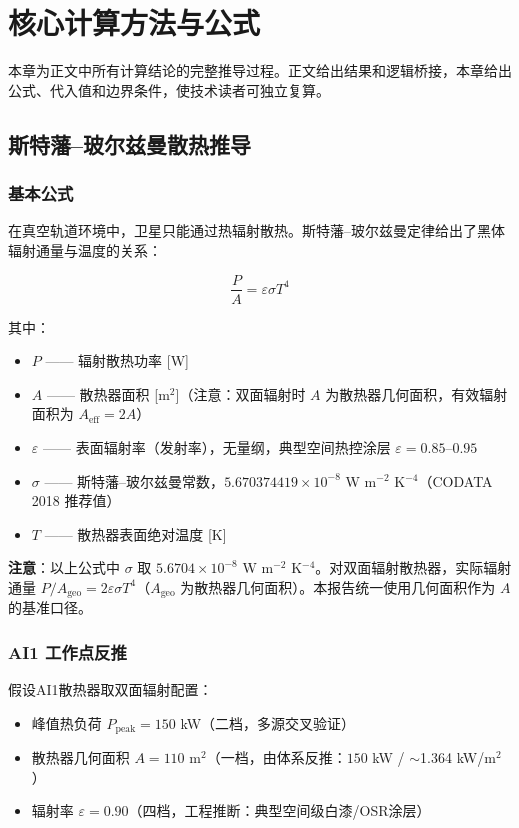 
\section{核心计算方法与公式}

本章为正文中所有计算结论的完整推导过程。正文给出结果和逻辑桥接，本章给出公式、代入值和边界条件，使技术读者可独立复算。

\subsection{斯特藩--玻尔兹曼散热推导}
\label{sec:sb-derivation}

\subsubsection{基本公式}

在真空轨道环境中，卫星只能通过热辐射散热。斯特藩--玻尔兹曼定律给出了黑体辐射通量与温度的关系：

\begin{equation}
  \frac{P}{A} = \varepsilon \sigma T^{4}
  \label{eq:sb-basic}
\end{equation}

其中：
\begin{itemize}
  \item $P$ —— 辐射散热功率 [W]
  \item $A$ —— 散热器面积 [m$^2$]（注意：双面辐射时 $A$ 为散热器几何面积，有效辐射面积为 $A_{\text{eff}} = 2A$）
  \item $\varepsilon$ —— 表面辐射率（发射率），无量纲，典型空间热控涂层 $\varepsilon = 0.85\text{--}0.95$
  \item $\sigma$ —— 斯特藩--玻尔兹曼常数，$5.670374419 \times 10^{-8}$ W m$^{-2}$ K$^{-4}$（CODATA 2018 推荐值）
  \item $T$ —— 散热器表面绝对温度 [K]
\end{itemize}

\textbf{注意}：以上公式中 $\sigma$ 取 $5.6704 \times 10^{-8}$ W m$^{-2}$ K$^{-4}$。对双面辐射散热器，实际辐射通量 $P/A_{\text{geo}} = 2\varepsilon\sigma T^{4}$（$A_{\text{geo}}$ 为散热器几何面积）。本报告统一使用几何面积作为 $A$ 的基准口径。

\subsubsection{AI1 工作点反推}

假设AI1散热器取双面辐射配置：
\begin{itemize}
  \item 峰值热负荷 $P_{\text{peak}} = 150$ kW（二档，多源交叉验证）
  \item 散热器几何面积 $A = 110$ m$^2$（一档，由体系反推：$150$ kW / $\sim$1.364 kW/m$^2$）
  \item 辐射率 $\varepsilon = 0.90$（四档，工程推断：典型空间级白漆/OSR涂层）
\end{itemize}

